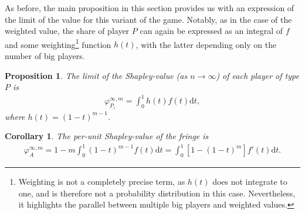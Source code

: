 \documentclass[a4paper]{article}
\newtheorem{proposition}{Proposition}
\newtheorem{corollary}{Corollary}
\newcommand{\dt}{\mathrm{d}t}
\begin{document}
As before, the main proposition in this section provides us with an expression of the limit of the value for this variant of the game.
Notably, as in the case of the weighted value, the share of player $P$ can again be expressed as an integral of $f$ and some weighting\footnote{
    Weighting is not a completely precise term, as $h(t)$ does not integrate to one, and is therefore not a probability distribution in this case.
    Nevertheless, it highlights the parallel between multiple big players and weighted values.
} function $h(t)$, with the latter depending only on the number of big players.
\begin{proposition}
    \label{prop:multiple_platforms}
    The limit of the Shapley-value (as $n \to \infty$) of each player of type $P$ is
    \begin{align*}
        \varphi_{P_i}^{\infty, m} = \int_0^1 h(t) f(t) \dt,
    \end{align*}
    where $h(t) = (1-t) ^ {m-1}$.
\end{proposition}

\begin{corollary}
    \label{cor:multiple_platforms}
    The per-unit Shapley-value of the fringe is
    \begin{align*}
        \varphi_A^{\infty, m} = 1 - m\int_0^1 (1-t) ^ {m-1} f(t) \dt = \int_0^1 [1 - (1-t)^m] f'(t) \dt .
    \end{align*}
\end{corollary}
\end{document}
